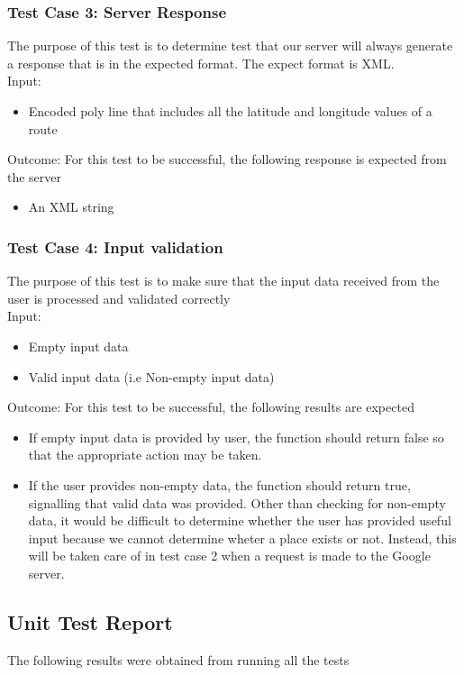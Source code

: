 \documentclass{article}
\begin{document}
\subsubsection{Test Case 3: Server Response}
The purpose of this test is to determine test that our server will always generate a response that is in the expected format. The expect format is XML.
\\Input: \begin{itemize}
\item Encoded poly line that includes all the latitude and longitude values of a route
\end{itemize}
Outcome: For this test to be successful, the following response is expected from the server
\begin{itemize}
\item An XML string
\end{itemize}

\subsubsection{Test Case 4: Input validation}
The purpose of this test is to make sure that the input data received from the user is processed and validated correctly
\\Input: \begin{itemize}
\item Empty input data
\item Valid input data (i.e Non-empty input data)
\end{itemize}
Outcome: For this test to be successful, the following results are expected
\begin{itemize}
\item If empty input data is provided by user, the function should return false so that the appropriate action may be taken.
\item If the user provides non-empty data, the function should return true, signalling that valid data was provided. Other than checking for non-empty data, it would be difficult to determine whether the user has provided useful input because we cannot determine wheter a place exists or not. Instead, this will be taken care of in test case 2 when a request is made to the Google server.
\end{itemize}
\subsection{Unit Test Report}
The following results were obtained from running all the tests
\end{document}
